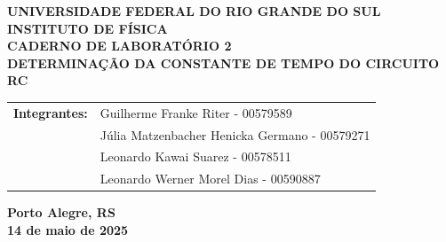 \documentclass[12pt, a4paper]{article}
\begin{document}
\begin{center}
    \textbf{\large UNIVERSIDADE FEDERAL DO RIO GRANDE DO SUL} \\
    \textbf{\large INSTITUTO DE FÍSICA} \\
    \vspace{3cm}
    \textbf{\Large CADERNO DE LABORATÓRIO 2} \\
    \vspace{1cm}
    \textbf{\large DETERMINAÇÃO DA CONSTANTE DE TEMPO DO CIRCUITO RC} \\
    \vspace{3cm}
    
    \begin{tabular}{rl}
        \textbf{Integrantes:} & Guilherme Franke Riter - 00579589 \\
                               & Júlia Matzenbacher Henicka Germano - 00579271 \\
                               & Leonardo Kawai Suarez - 00578511 \\
                               & Leonardo Werner Morel Dias - 00590887 \\
    \end{tabular}
    
    \vspace{12cm}
    \textbf{\large Porto Alegre, RS} \\
    \textbf{\large 14 de maio de 2025} \\
\end{center}\newpage
\end{document}
